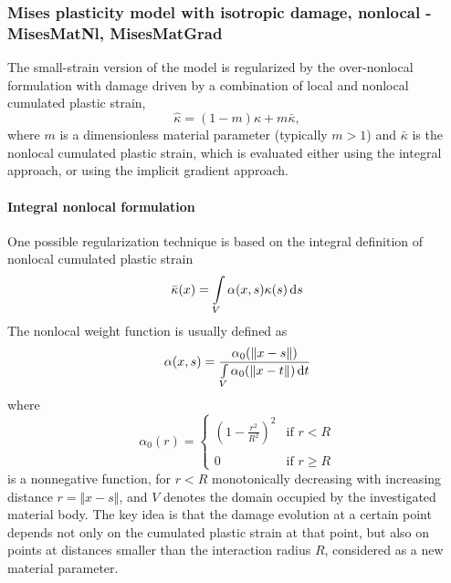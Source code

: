\documentclass[a4paper]{article}
\begin{document}
\subsubsection{Mises plasticity model with isotropic damage, nonlocal - MisesMatNl, MisesMatGrad}
The small-strain version of the model is regularized by the over-nonlocal formulation with damage driven by a combination of local and nonlocal cumulated plastic strain,
\begin{equation}\label{overKappa1}
\hat{\kappa} = (1-m)\kappa + m\bar{\kappa},
\end{equation}
where $m$ is a dimensionless material parameter (typically $m>1$) and $\bar{\kappa}$ is the nonlocal cumulated plastic strain, which is evaluated either using the integral approach,
or using the implicit gradient approach.

\paragraph{Integral nonlocal formulation}
One possible regularization technique is based on the integral definition of nonlocal
  cumulated plastic strain
\begin{equation}\label{nonLocalPlStrain1}
\bar{\kappa}(x) = \int\limits_V \alpha(x,s)\kappa(s)\,{\rm d}s
\end{equation}
The nonlocal weight function is usually defined as
\begin{equation}
\alpha(x,s) = \frac{\alpha_0(\Vert x-s\Vert )}{\int\limits_V\alpha_0(\Vert x-t\Vert )\,{\rm d}t}
\end{equation}
where
\begin{equation}\label{alpha0}
\alpha_0(r) = \begin{cases} \left(1-\frac{r^2}{R^2}\right)^2 &\text{if $r<R$}\\ 
\\
0 & \text{if $r \ge R$}
\end{cases}
\end{equation}
is a nonnegative function, for $r<R$ monotonically decreasing with increasing distance $r=\Vert x-s\Vert$, and $V$ denotes the domain occupied by the investigated material body.
The key idea is that the damage evolution at a certain point depends not only on the cumulated plastic strain at that point, but also on points at distances smaller than the interaction radius $R$, considered as a new material parameter. 
\end{document}

